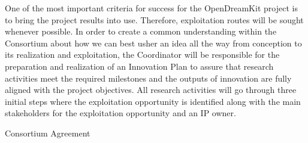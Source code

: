 \begin{workpackage}
\begin{tasklist}
\begin{task}[title=Innovation management,
id=project-innovation-management,lead=PS,PM=10,
partners={LL,UV,UJF,UB,UO,USH,USO,SA,UW,JU,UK,US,ZH,SR,UWS}]
One of the most important criteria for success for the OpenDreamKit project is to bring the project results into use. Therefore, exploitation routes will be sought whenever possible. In
order to create a common understanding within the Consortium about how we can best usher
an idea all the way from conception to its realization and exploitation, the Coordinator will be responsible for
the preparation and realization of an Innovation Plan to assure that research activities meet the
required milestones and the outputs of innovation are fully aligned with the project objectives.
All research activities will go through three initial steps where the exploitation opportunity is
identified along with the main stakeholders for the exploitation opportunity and an IP owner.
\end{task}
\end{tasklist}

%


\begin{wpdelivs}
\begin{wpdeliv}[due=1,id=ca,dissem=CO,nature=R,lead=PS]{Consortium Agreement}
\end{wpdeliv}


\end{wpdelivs}
\end{workpackage}
